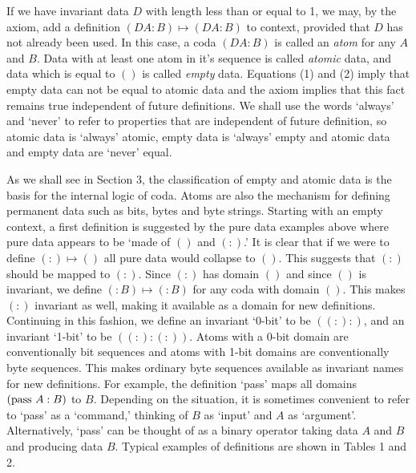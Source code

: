 \documentclass[11pt]{article}
\begin{document}
      If we have invariant data $D$ with length less than or equal to 1, we may, by the axiom,
add a definition $(D A:B)\mapsto(D A:B)$ to context, provided
that $D$ has not already been used.  In this case, a coda $(D A:B)$ is called an {\it atom} for any $A$ and $B$.
Data with at least one atom in it's sequence is called {\it atomic} data, and data which is equal to $()$ is called {\it empty} data.
Equations (1) and (2) imply that empty data can not be equal to atomic data and the axiom implies that this fact remains
true independent of future definitions.  We shall use the words `always' and `never' to refer to properties that are independent of
future definition, so atomic data is `always' atomic, empty data is `always' empty and atomic data and empty data are `never' equal.

    As we shall see in Section 3, the classification of empty and atomic data is the basis for the internal logic of coda.
Atoms are also the mechanism for defining permanent data such as bits, bytes and byte strings.
Starting with an empty context, a first definition is suggested by the pure data examples above where pure data
appears to be `made of $()$ and $(:)$.'
It is clear that if we were to define $(:)\mapsto()$ all pure data would collapse to $()$.  This suggests that $(:)$ should be
mapped to $(:)$.  Since $(:)$ has domain $()$ and since $()$ is invariant, we define $(:B)\mapsto(:B)$ for any coda with
domain $()$.  This makes $(:)$ invariant as well, making it available as a domain for new definitions.
Continuing in this fashion, we define an invariant `0-bit' to be $((:):)$, and an invariant `1-bit' to be $((:):(:))$.
Atoms with a 0-bit domain are conventionally bit sequences and atoms with 1-bit domains are conventionally byte sequences.
This makes ordinary byte sequences available as invariant names for new definitions.  For example, the definition `pass' maps
all domains $({\rm pass}\ A:B)$ to $B$.  Depending on the situation,
it is sometimes convenient to refer to `pass' as a `command,' thinking of $B$ as
`input' and $A$ as `argument'.  Alternatively, `pass' can be thought of as a binary operator taking data $A$ and $B$ and producing data $B$.
Typical examples of definitions are shown in Tables 1 and 2.
\end{document}
